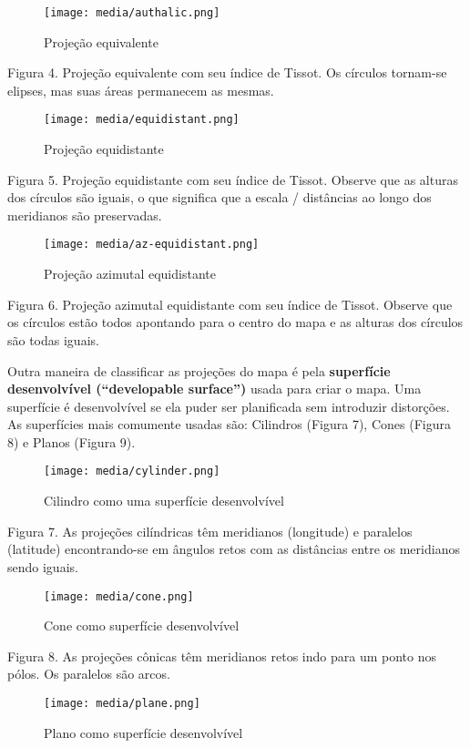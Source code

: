 \documentclass[
]{book}
\theoremstyle{definition}
\theoremstyle{definition}
\theoremstyle{definition}
\theoremstyle{definition}
\theoremstyle{remark}
\begin{document}
\begin{figure}
\centering
\texttt{[image: media/authalic.png]}
\caption{Projeção equivalente}
\end{figure}

Figura 4. Projeção equivalente com seu índice de Tissot. Os círculos tornam-se elipses, mas suas áreas permanecem as mesmas.

\begin{figure}
\centering
\texttt{[image: media/equidistant.png]}
\caption{Projeção equidistante}
\end{figure}

Figura 5. Projeção equidistante com seu índice de Tissot. Observe que as alturas dos círculos são iguais, o que significa que a escala / distâncias ao longo dos meridianos são preservadas.

\begin{figure}
\centering
\texttt{[image: media/az-equidistant.png]}
\caption{Projeção azimutal equidistante}
\end{figure}

Figura 6. Projeção azimutal equidistante com seu índice de Tissot. Observe que os círculos estão todos apontando para o centro do mapa e as alturas dos círculos são todas iguais.

Outra maneira de classificar as projeções do mapa é pela \textbf{superfície desenvolvível (``developable surface'')} usada para criar o mapa. Uma superfície é desenvolvível se ela puder ser planificada sem introduzir distorções. As superfícies mais comumente usadas são: Cilindros (Figura 7), Cones (Figura 8) e Planos (Figura 9).

\begin{figure}
\centering
\texttt{[image: media/cylinder.png]}
\caption{Cilindro como uma superfície desenvolvível}
\end{figure}

Figura 7. As projeções cilíndricas têm meridianos (longitude) e paralelos (latitude) encontrando-se em ângulos retos com as distâncias entre os meridianos sendo iguais.

\begin{figure}
\centering
\texttt{[image: media/cone.png]}
\caption{Cone como superfície desenvolvível}
\end{figure}

Figura 8. As projeções cônicas têm meridianos retos indo para um ponto nos pólos. Os paralelos são arcos.

\begin{figure}
\centering
\texttt{[image: media/plane.png]}
\caption{Plano como superfície desenvolvível}
\end{figure}
\end{document}
